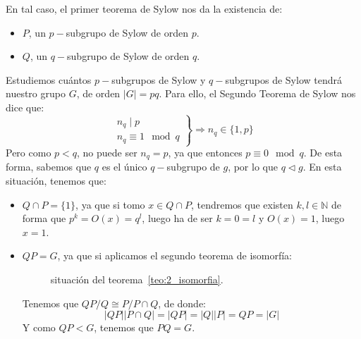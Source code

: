 \noindent
En tal caso, el primer teorema de Sylow nos da la existencia de:
\begin{itemize}
    \item $P$, un $p-$subgrupo de Sylow de orden $p$.
    \item $Q$, un $q-$subgrupo de Sylow de orden $q$.
\end{itemize}
Estudiemos cuántos $p-$subgrupos de Sylow y $q-$subgrupos de Sylow tendrá nuestro grupo $G$, de orden $|G| = pq$. Para ello, el Segundo Teorema de Sylow nos dice que:
\begin{equation*}
    \left.\begin{array}{r}
            n_q \mid p \\
            n_q\equiv 1 \mod q
    \end{array}\right\} \Longrightarrow n_q \in \{1,p\}
\end{equation*}
Pero como $p<q$, no puede ser $n_q = p$, ya que entonces $p\equiv 0 \mod q$. De esta forma, sabemos que $q$ es el único $q-$subgrupo de $g$, por lo que $q\lhd g$. En esta situación, tenemos que:
\begin{itemize}
    \item $Q\cap P = \{1\}$, ya que si tomo $x\in Q\cap P$, tendremos que existen $k,l\in \mathbb{N}$ de forma que $p^k = O(x) = q^l$, luego ha de ser $k = 0 = l$ y $O(x) = 1$, luego $x = 1$.
    \item $QP = G$, ya que si aplicamos el segundo teorema de isomorfía:
        \begin{figure}[h]
            \centering
            \caption{situación del teorema~\ref{teo:2_isomorfia}.}
            \label{fig:2_isomorfia}
        \end{figure}
        Tenemos que $QP/Q \cong P/P\cap Q$, de donde:
        \begin{equation*}
            |QP||P\cap Q| = |QP| = |Q||P| = QP = |G|
        \end{equation*}
        Y como $QP < G$, tenemos que $PQ = G$.
\end{itemize}
